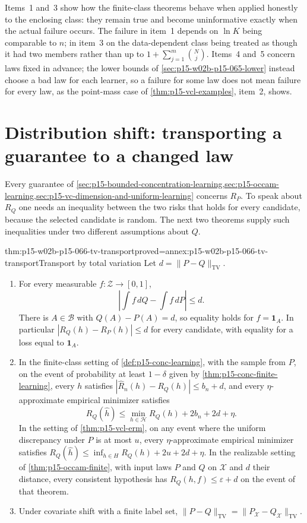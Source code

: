 Items~1 and~3 show how the finite-class theorems behave when applied
honestly to the enclosing class: they remain true and become
uninformative exactly when the actual failure occurs. The failure in
item~1 depends on \(\ln K\) being comparable to \(n\); in item~3 on the
data-dependent class being treated as though it had two members rather
than up to \(1+\sum_{j=1}^m\binom Nj\). Items~4 and~5 concern laws fixed in
advance; the lower bounds of \cref{sec:p15-w02b-p15-065-lower}
instead choose a bad law for each learner, so a failure for some law does not mean failure for
every law, as the point-mass case of \cref{thm:p15-vcl-examples},
item~2, shows.

\section{Distribution shift: transporting a guarantee to a changed law}
\label{sec:p15-w02b-p15-066-shift}

Every guarantee of
\cref{sec:p15-bounded-concentration-learning,sec:p15-occam-learning,sec:p15-vc-dimension-and-uniform-learning}
concerns \(R_P\). To speak about \(R_Q\) one needs an inequality between
the two risks that holds for every candidate, because the selected
candidate is random. The next two theorems supply such inequalities
under two different assumptions about \(Q\).

\begin{hbtheorem}{thm:p15-w02b-p15-066-tv-transport}{proved=annex:p15-w02b-p15-066-tv-transport}{Transport by total variation}
Let \(d=\|P-Q\|_{\mathrm{TV}}\).
\begin{enumerate}
\item For every measurable \(f:\mathcal Z\to[0,1]\),
      \[
       \left|\int f\,dQ-\int f\,dP\right|\leq d .
      \]
      There is \(A\in\mathcal B\) with \(Q(A)-P(A)=d\), so equality holds
      for \(f=\mathbf1_A\). In particular \(|R_Q(h)-R_P(h)|\leq d\) for
      every candidate, with equality for a loss equal to
      \(\mathbf1_A\).
\item In the finite-class setting of \cref{def:p15-conc-learning}, with
      the sample from \(P\), on the event of probability at least
      \(1-\delta\) given by \cref{thm:p15-conc-finite-learning}, every
      \(h\) satisfies \(|\widehat R_n(h)-R_Q(h)|\leq b_n+d\), and every
      \(\eta\)-approximate empirical minimizer satisfies
      \[
       R_Q(\widehat h)\leq\min_{h\in\mathcal H}R_Q(h)+2b_n+2d+\eta .
      \]
      In the setting of \cref{thm:p15-vcl-erm}, on any event where the
      uniform discrepancy under \(P\) is at most \(u\), every
      \(\eta\)-approximate empirical minimizer satisfies
      \(R_Q(\widehat h)\leq\inf_{h\in H}R_Q(h)+2u+2d+\eta\).
      In the realizable setting of \cref{thm:p15-occam-finite}, with
      input laws \(P\) and \(Q\) on \(\mathcal X\) and \(d\) their
      distance, every consistent hypothesis has
      \(R_Q(h,f)\leq\varepsilon+d\) on the event of that theorem.
\item Under covariate shift with a finite label set,
      \(\|P-Q\|_{\mathrm{TV}}=\|P_{\mathcal X}-Q_{\mathcal X}\|_{\mathrm{TV}}\).
\end{enumerate}
\end{hbtheorem}

